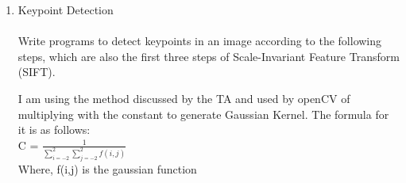 \documentclass[12pt]{article}
\newenvironment{QandA}
{
	\begin{enumerate}[label=\normalfont\arabic*.,leftmargin=2em,rightmargin=2em]\normalfont
	}
	{
	\end{enumerate}
}
\newenvironment{codelalala}{}{}
\newenvironment{answered}{\setlength{\parindent}{1em}\par\normalfont}{}
\begin{document}
\begin{QandA}
\begin{answered}
\begin{codelalala}
\begin{verbatim}
print("Original image size: {:4d} x {:4d}".format(a.shape[0], a.shape[1]))
print("Resulting image size: {:4d} x {:4d}".format(combined_norm.shape[0], combined_norm.shape[1]))
		\end{verbatim}
		\end{codelalala}
		Observations:
        \\
        Edge detection along x and y directions have been computed(See Fig \ref{edge-detection}). I have also combined both the edges, see Fig. \ref{edge-detection-combined}. When I was using the old basic divide by 255 normalizations, I was missing few edges, however, when I used the absolute-valued normalization, the results were better.
	\begin{figure}
		\centering
  			\caption{Combined edge detected in x and y axis}
  		\label{edge-detection-combined}
	\end{figure}
	\end{answered}
	\item Keypoint Detection
	\\
	\\
	Write programs to detect keypoints in an image according to the following steps, which are also the first three steps of Scale-Invariant Feature Transform (SIFT).
\begin{answered}
I am using the method discussed by the TA and used by openCV of multiplying with the constant to generate Gaussian Kernel. The formula for it is as follows:
\\
C = $\frac{1}{\sum_{i=-2}^{2}\sum_{j=-2}^{2}f(i,j)}$
\\
Where, f(i,j) is the gaussian function
\\

\end{answered}
\end{QandA}
\end{document}
